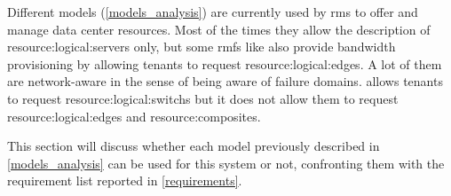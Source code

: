 Different \glspl{model} (\autoref{models_analysis}) are currently used by \glspl{rm} to offer and manage data center resources.
Most of the times they allow the description of \glspl{resource:logical:server} only, but some \glspl{rmf} like \cite{kraken, cloudmirror, oktopus} also provide bandwidth provisioning by allowing tenants to request \glspl{resource:logical:edge}.
A lot of them are network-aware in the sense of being aware of failure domains.
\cite{ontackling} allows tenants to request \glspl{resource:logical:switch} but it does not allow them to request \glspl{resource:logical:edge} and \glspl{resource:composite}.

This section will discuss whether each \gls{model} previously described in \autoref{models_analysis} can be used for this system or not, confronting them with the requirement list reported in \autoref{requirements}.